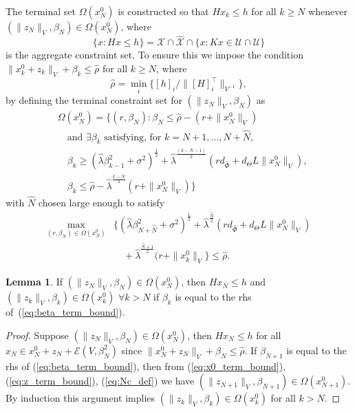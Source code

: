 \documentclass{IEEEtran}
\theoremstyle{definition}
\newtheorem{lemma}{Lemma}
\theoremstyle{remark}
\begin{document}
The terminal set $\Omega(x^0_N)$ is constructed so that 
$Hx_k \leq h$ for all $k\geq N$ whenever $(\|z_N\|_V,\beta_N) \in\Omega(x^0_N)$, where
\[
\{x : Hx \leq h\}
 = \mathcal{X} \cap \hat{\mathcal{X}} \cap \{x : Kx \in \mathcal{U} \cap \hat{\mathcal{U}}\} 
\]
is the aggregate constraint set.
To ensure this we impose the condition $\|x^0_k + z_k\|_V + \beta_k \leq \hat{\rho}$ for all $k\geq N$, where 
\begin{equation}\label{eq:rho_def}
\hat{\rho} = \min_i \bigl\{ [h]_i/\|[H]_i^\top\|_{V^{-1}}\bigr\} ,
\end{equation}
by defining the terminal constraint set for $(\|z_N\|_V, \beta_N)$ as%
\begin{align}
& \Omega(x^0_N) = \bigl\{
(r,\beta_N) : 
\beta_N \leq \hat{\rho} - (r + \|x^0_N\|_V)
\nonumber\\
& \quad \text{and } \exists \beta_{k} \text{ satisfying, for }
k=N+1,\ldots, N+\hat{N}, 
\nonumber\\
& \quad \beta_{k} \geq 
(\hat{\lambda}\beta_{k-1}^2 + \sigma^2)^{\frac{1}{2}}
+ \hat{\lambda}^{\frac{(k-N-1)}{2}} (r d_{\hat{\Phi}} +  d_\Theta L \|x^0_N\|_{V}) ,
\nonumber\\
& \quad \beta_{k}
\leq \hat{\rho} - \hat{\lambda}^\frac{k-N}{2}(r + \|x^0_N\|_V) \bigr\}
\label{eq:term_constraint_set}
\end{align}
with $\hat{N}$ chosen large enough to satisfy 
\begin{align}
\max_{(r,\beta_N)\in\Omega(x^0_N)} & \bigl\{
(\hat{\lambda}\beta_{N+\hat{N}\!}^2 + \sigma^2)^{\frac{1}{2}\!} 
+ \hat{\lambda}^\frac{\hat{N}}{2}\! (r d_{\hat{\Phi}} +  d_\Theta L \|x^0_N\|_V) 
\nonumber \\
&\quad + \hat{\lambda}^\frac{\hat{N}+1}{2} (r +  \|x_k^0\|_V \bigr\} 
\leq \hat{\rho}
.
\label{eq:Nc_def}
\end{align}

\begin{lemma}\label{lem:termset}
If $(\|z_N\|_V,\beta_N)\in\Omega(x^0_N)$, then $Hx_N \leq h$ 
and
$(\|z_{k}\|_V, \beta_{k})\in \Omega(x^0_k)$ $\forall k>N$
if $\beta_k$ is equal to the rhs of~(\ref{eq:beta_term_bound}).
\end{lemma}

\begin{proof}
Suppose $(\|z_N\|_V,\beta_N)\in\Omega(x^0_N)$, then 
$Hx_N\leq h$ 
for all $x_N\in x^0_N+z_N+\mathcal{E}(V,\beta_N^2)$ 
since ${\|x^0_N + z_N\|_V + \beta_N \leq \hat{\rho}}$. If $\beta_{N+1}$ is equal to the rhs of (\ref{eq:beta_term_bound}), then from (\ref{eq:x0_term_bound}), (\ref{eq:z_term_bound}), (\ref{eq:Nc_def}) we have $(\|z_{N+1}\|_V,\beta_{N+1})\in\Omega(x^0_{N+1})$. 
By induction this argument implies $(\|z_{k}\|_V,\beta_{k})\in \Omega(x^0_k)$ for all $k>N$.
\end{proof}
\end{document}
